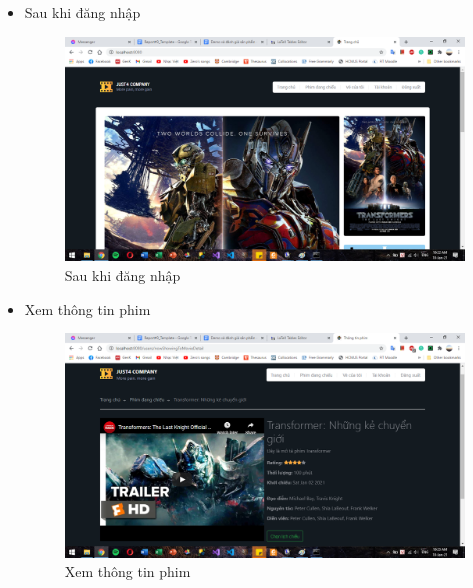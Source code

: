 \documentclass[a4paper, 12pt]{article}
\begin{document}
\begin{itemize}
	\item Sau khi đăng nhập
	\begin{figure}[H]
		\begin{center}
			\includegraphics[scale=0.5]{./image/demo_userloggedin.png}
			\caption{Sau khi đăng nhập}
		\end{center}
	\end{figure}

	\item Xem thông tin phim
	\begin{figure}[H]
		\begin{center}
			\includegraphics[scale=0.5]{./image/demo_movieDetail.png}
			\caption{Xem thông tin phim}
		\end{center}
	\end{figure}


\end{itemize}
\end{document}
